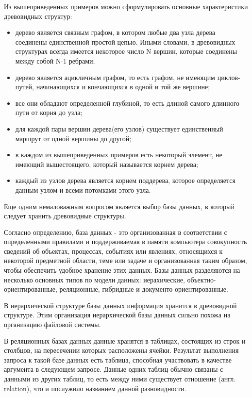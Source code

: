 \documentclass[a4paper,14pt]{extreport}
\theoremstyle{definition}
\begin{document}
Из вышеприведенных примеров можно сформулировать основные характеристики древовидных структур\cite{Ivanov}:
\begin{itemize}
\item дерево является связным графом, в котором любые два узла дерева соединены единственной простой цепью. Иными словами, в древовидных структурах всегда имеется некоторое число N вершин, которые соединены между собой N-1 ребрами;
\item дерево является ацикличным графом, то есть графом, не имеющим циклов-путей, начинающихся и кончающихся в одной и той же вершине;
\item все они обладают определенной глубиной, то есть длиной самого длинного пути от корня до узла;
\item для каждой пары вершин дерева(его узлов) существует единственный маршрут от одной вершины до другой;
\item в каждом из вышеприведенных примеров есть некоторый элемент, не имеющий вышестоящего, который называется корнем дерева;
\item каждый из узлов дерева является корнем поддерева, которое определяется данным узлом и всеми потомками этого узла.
\end{itemize}

Еще одним немаловажным вопросом является выбор базы данных, в который следует хранить древовидные структуры.

Согласно определению\cite{Evseeva}, база данных - это организованная в соответствии с определенными правилами и поддерживаемая в памяти компьютера совокупность сведений об объектах, процессах, событиях или явлениях, относящихся к некоторой предметной области, теме или задаче и организованная таким образом, чтобы обеспечить удобное хранение этих данных. Базы данных разделяются на несколько основных типов по модели данных: иерахические, объектно-ориентированные, реляционные, гибридные и документо-ориентированные.

В иерархической структуре базы данных информация хранится в древовидной структуре\cite{Kuzin}. Этим организация иерархической базы данных сильно похожа на организацию файловой системы.

В реляционных базах данных данные хранятся в таблицах, состоящих из строк и столбцов, на пересечении которых расположены ячейки\cite{Ullman}. Результат выполнения запроса к такой базе данных есть таблица, способная участвовать в качестве аргумента в следующем запросе. Данные одних таблиц обычно связаны с данными из других таблиц, то есть между ними существует отношение (англ. relation), что и послужило названием данной разновидности.
\end{document}

